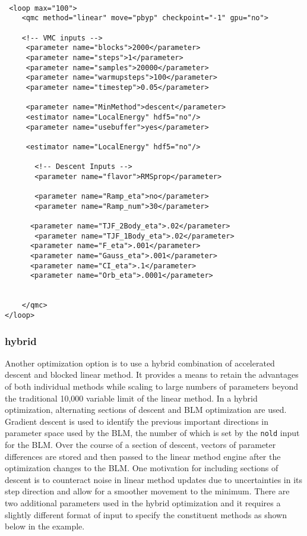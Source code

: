 \begin{lstlisting}[style=QMCPXML]
 
 <loop max="100">
    <qmc method="linear" move="pbyp" checkpoint="-1" gpu="no">
    
    <!-- VMC inputs -->
     <parameter name="blocks">2000</parameter>
     <parameter name="steps">1</parameter>
     <parameter name="samples">20000</parameter>
     <parameter name="warmupsteps">100</parameter>
     <parameter name="timestep">0.05</parameter>

     <parameter name="MinMethod">descent</parameter>
     <estimator name="LocalEnergy" hdf5="no"/>
     <parameter name="usebuffer">yes</parameter>

     <estimator name="LocalEnergy" hdf5="no"/>
           
	   <!-- Descent Inputs -->
       <parameter name="flavor">RMSprop</parameter>

       <parameter name="Ramp_eta">no</parameter>
       <parameter name="Ramp_num">30</parameter>
           
      <parameter name="TJF_2Body_eta">.02</parameter>
       <parameter name="TJF_1Body_eta">.02</parameter>
      <parameter name="F_eta">.001</parameter>
      <parameter name="Gauss_eta">.001</parameter>
      <parameter name="CI_eta">.1</parameter>
      <parameter name="Orb_eta">.0001</parameter>


    </qmc>
</loop> 
 \end{lstlisting}


\subsubsection{hybrid}

Another optimization option is to use a hybrid combination of accelerated descent and blocked linear method.
It provides a means to retain the advantages of both individual methods while scaling to large numbers of parameters beyond the traditional 10,000 variable limit of the linear method.\cite{Otis2019}
In a hybrid optimization, alternating sections of descent and BLM optimization are used.
Gradient descent is used to identify the previous important directions in parameter space used by the BLM, the number of which is set by the \texttt{nold} input for the BLM.
Over the course of a section of descent, vectors of parameter differences are stored and then passed to the linear method engine after the optimization changes to the BLM.
One motivation for including sections of descent is to counteract noise in linear method updates due to uncertainties in its step direction and allow for a smoother movement to the minimum.
There are two additional parameters used in the hybrid optimization and it requires a slightly different format of input to specify the constituent methods as shown below in the example.

